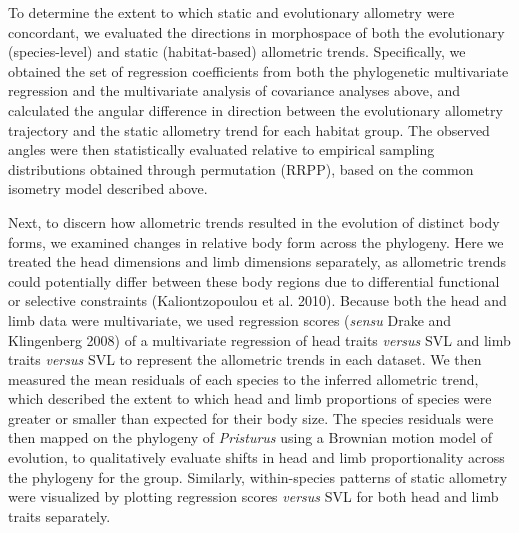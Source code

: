 \documentclass[
  11pt,
]{article}
\begin{document}
To determine the extent to which static and evolutionary allometry were
concordant, we evaluated the directions in morphospace of both the
evolutionary (species-level) and static (habitat-based) allometric
trends. Specifically, we obtained the set of regression coefficients
from both the phylogenetic multivariate regression and the multivariate
analysis of covariance analyses above, and calculated the angular
difference in direction between the evolutionary allometry trajectory
and the static allometry trend for each habitat group. The observed
angles were then statistically evaluated relative to empirical sampling
distributions obtained through permutation (RRPP), based on the common
isometry model described above. \hfill\break

Next, to discern how allometric trends resulted in the evolution of
distinct body forms, we examined changes in relative body form across
the phylogeny. Here we treated the head dimensions and limb dimensions
separately, as allometric trends could potentially differ between these
body regions due to differential functional or selective constraints
(Kaliontzopoulou et al. 2010). Because both the head and limb data were
multivariate, we used regression scores (\emph{sensu} Drake and
Klingenberg 2008) of a multivariate regression of head traits
\emph{versus} SVL and limb traits \emph{versus} SVL to represent the
allometric trends in each dataset. We then measured the mean residuals
of each species to the inferred allometric trend, which described the
extent to which head and limb proportions of species were greater or
smaller than expected for their body size. The species residuals were
then mapped on the phylogeny of \emph{Pristurus} using a Brownian motion
model of evolution, to qualitatively evaluate shifts in head and limb
proportionality across the phylogeny for the group. Similarly,
within-species patterns of static allometry were visualized by plotting
regression scores \emph{versus} SVL for both head and limb traits
separately. \hfill\break
\end{document}
